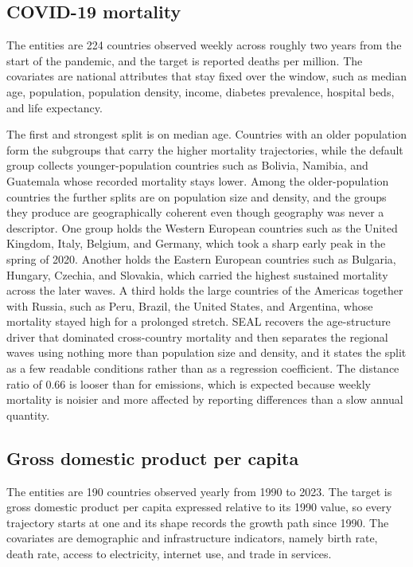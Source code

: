 \subsection{COVID-19 mortality}
\label{sec:covid}

The entities are 224 countries observed weekly across roughly two years from the start of the pandemic, and the target is reported deaths per million. The covariates are national attributes that stay fixed over the window, such as median age, population, population density, income, diabetes prevalence, hospital beds, and life expectancy.

The first and strongest split is on median age. Countries with an older population form the subgroups that carry the higher mortality trajectories, while the default group collects younger-population countries such as Bolivia, Namibia, and Guatemala whose recorded mortality stays lower. Among the older-population countries the further splits are on population size and density, and the groups they produce are geographically coherent even though geography was never a descriptor. One group holds the Western European countries such as the United Kingdom, Italy, Belgium, and Germany, which took a sharp early peak in the spring of 2020. Another holds the Eastern European countries such as Bulgaria, Hungary, Czechia, and Slovakia, which carried the highest sustained mortality across the later waves. A third holds the large countries of the Americas together with Russia, such as Peru, Brazil, the United States, and Argentina, whose mortality stayed high for a prolonged stretch. SEAL recovers the age-structure driver that dominated cross-country mortality and then separates the regional waves using nothing more than population size and density, and it states the split as a few readable conditions rather than as a regression coefficient. The distance ratio of $0.66$ is looser than for emissions, which is expected because weekly mortality is noisier and more affected by reporting differences than a slow annual quantity.

\subsection{Gross domestic product per capita}
\label{sec:worldbank}

The entities are 190 countries observed yearly from 1990 to 2023. The target is gross domestic product per capita expressed relative to its 1990 value, so every trajectory starts at one and its shape records the growth path since 1990. The covariates are demographic and infrastructure indicators, namely birth rate, death rate, access to electricity, internet use, and trade in services.

